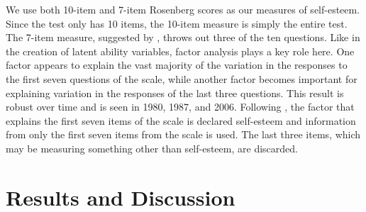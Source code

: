 \documentclass[12pt]{report}
\newcommand{\citee}[1]{\citename{#1} \citeyear{#1}}
\begin{document}
We use both 10-item and 7-item Rosenberg scores as our measures of self-esteem. Since the test only has 10 items, the 10-item measure is simply the entire test. The 7-item measure, suggested by \citee{M2001}, throws out three of the ten questions. Like in the creation of latent ability variables, factor analysis plays a key role here. One factor appears to explain the vast majority of the variation in the responses to the first seven questions of the scale, while another factor becomes important for explaining variation in the responses of the last three questions. This result is robust over time and is seen in 1980, 1987, and 2006. Following \citee{M2001}, the factor that explains the first seven items of the scale is declared self-esteem and information from only the first seven items from the scale is used. The last three items, which may be measuring something other than self-esteem, are discarded.



\begin{comment} This section will contain a short discussion of the estimation techniques used and how they differ \end{comment}

\chapter{Results and Discussion}
\end{document}
